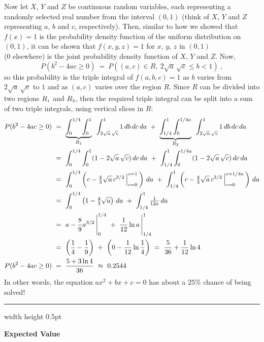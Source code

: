 \begin{exmp}
 Now let $X$, $Y$ and $Z$ be continuous random variables, each representing a randomly selected real number from the
 interval $(0,1)$ (think of $X$, $Y$ and $Z$ representing $a$, $b$ and $c$, respectively).
 Then, similar to how we showed that $f(x)=1$ is the probability density function of the uniform distribution on $(0,1)$, it can be shown
 that $f(x,y,z)=1$ for $x$, $y$, $z$ in $(0,1)$\\($0$ elsewhere) is the joint probability density function of $X$, $Y$ and $Z$.
 Now,
 \begin{displaymath}
  P(b^2 - 4ac \ge 0) ~=~ P((a,c) \in R,~2\sqrt{a}\,\sqrt{c} \le b < 1)~,
 \end{displaymath}
 so this probability is the triple integral of $f(a,b,c) = 1$ as $b$ varies from $2\sqrt{a}\,\sqrt{c}$ to $1$ and as
 $(a,c)$ varies over the region $R$. Since $R$ can be divided into two regions $R_{\scriptscriptstyle 1}$ and $R_{\scriptscriptstyle 2}$, then
 the required triple integral can be split into a sum of two triple integrals, using vertical slices in $R$:
 \begin{align*}
  P(b^2 - 4ac \ge 0) ~&=~
  \underbrace{\int_0^{1/4} \int_0^1}_{R_{\scriptscriptstyle 1}}\,\,\, \int_{2\sqrt{a}\,\sqrt{c}}^1 1\,db\,dc\,da ~+~
  \underbrace{\int_{1/4}^1 \int_0^{1/4a}}_{R_{\scriptscriptstyle 2}}\,\,\, \int_{2\sqrt{a}\,\sqrt{c}}^1 1\,db\,dc\,da\\
  &=~ \int_0^{1/4} \int_0^1 (1-2\sqrt{a}\,\sqrt{c})\,dc\,da ~+~
   \int_{1/4}^1 \int_0^{1/4a} (1-2\sqrt{a}\,\sqrt{c})\,dc\,da\\
  &=~ \int_0^{1/4} \left( c - \tfrac{4}{3}\sqrt{a}\,c^{3/2} \,\Big|_{c=0}^{c=1} \,\right)\,da ~+~
   \int_{1/4}^1 \left( c - \tfrac{4}{3}\sqrt{a}\,c^{3/2} \,\Big|_{c=0}^{c=1/4a} \,\right)\,da\\
  &=~ \int_0^{1/4} \left( 1 - \tfrac{4}{3}\sqrt{a} \right)\,da ~+~
   \int_{1/4}^1 \tfrac{1}{12a}\,da\\
  &=~ a - \frac{8}{9}a^{3/2}\,\Bigg|_0^{1/4} ~+~ \frac{1}{12}\ln a \,\Bigg|_{1/4}^1\\
  &=~ \left( \frac{1}{4} - \frac{1}{9} \right) ~+~ \left( 0 - \frac{1}{12}\ln \frac{1}{4} \right) ~=~
  \frac{5}{36} + \frac{1}{12}\ln 4\\
  P(b^2 - 4ac \ge 0) ~&=~ \frac{5+3\ln 4}{36} ~\approx~ 0.2544
 \end{align*}
 In other words, the equation $ax^2 + bx + c = 0$ has about a $25$\% chance of being solved!
\end{exmp}
\hrule width \textwidth height 0.5pt
\medskip

\par\noindent\textbf{\large{Expected Value}}\normalsize\smallskip


